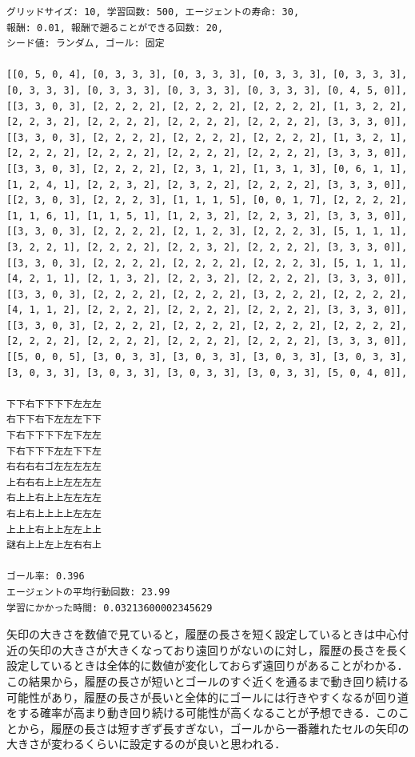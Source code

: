 \documentclass[a4j,11pt]{jarticle}
\begin{document}
\begin{verbatim}
グリッドサイズ: 10, 学習回数: 500, エージェントの寿命: 30,
報酬: 0.01, 報酬で遡ることができる回数: 20,
シード値: ランダム, ゴール: 固定

[[0, 5, 0, 4], [0, 3, 3, 3], [0, 3, 3, 3], [0, 3, 3, 3], [0, 3, 3, 3], [0, 3, 3, 3], [0, 3, 3, 3], [0, 3, 3, 3], [0, 3, 3, 3], [0, 4, 5, 0]],
[[3, 3, 0, 3], [2, 2, 2, 2], [2, 2, 2, 2], [2, 2, 2, 2], [1, 3, 2, 2], [2, 2, 3, 2], [2, 2, 2, 2], [2, 2, 2, 2], [2, 2, 2, 2], [3, 3, 3, 0]],
[[3, 3, 0, 3], [2, 2, 2, 2], [2, 2, 2, 2], [2, 2, 2, 2], [1, 3, 2, 1], [2, 2, 2, 2], [2, 2, 2, 2], [2, 2, 2, 2], [2, 2, 2, 2], [3, 3, 3, 0]],
[[3, 3, 0, 3], [2, 2, 2, 2], [2, 3, 1, 2], [1, 3, 1, 3], [0, 6, 1, 1], [1, 2, 4, 1], [2, 2, 3, 2], [2, 3, 2, 2], [2, 2, 2, 2], [3, 3, 3, 0]],
[[2, 3, 0, 3], [2, 2, 2, 3], [1, 1, 1, 5], [0, 0, 1, 7], [2, 2, 2, 2], [1, 1, 6, 1], [1, 1, 5, 1], [1, 2, 3, 2], [2, 2, 3, 2], [3, 3, 3, 0]],
[[3, 3, 0, 3], [2, 2, 2, 2], [2, 1, 2, 3], [2, 2, 2, 3], [5, 1, 1, 1], [3, 2, 2, 1], [2, 2, 2, 2], [2, 2, 3, 2], [2, 2, 2, 2], [3, 3, 3, 0]],
[[3, 3, 0, 3], [2, 2, 2, 2], [2, 2, 2, 2], [2, 2, 2, 3], [5, 1, 1, 1], [4, 2, 1, 1], [2, 1, 3, 2], [2, 2, 3, 2], [2, 2, 2, 2], [3, 3, 3, 0]],
[[3, 3, 0, 3], [2, 2, 2, 2], [2, 2, 2, 2], [3, 2, 2, 2], [2, 2, 2, 2], [4, 1, 1, 2], [2, 2, 2, 2], [2, 2, 2, 2], [2, 2, 2, 2], [3, 3, 3, 0]],
[[3, 3, 0, 3], [2, 2, 2, 2], [2, 2, 2, 2], [2, 2, 2, 2], [2, 2, 2, 2], [2, 2, 2, 2], [2, 2, 2, 2], [2, 2, 2, 2], [2, 2, 2, 2], [3, 3, 3, 0]],
[[5, 0, 0, 5], [3, 0, 3, 3], [3, 0, 3, 3], [3, 0, 3, 3], [3, 0, 3, 3], [3, 0, 3, 3], [3, 0, 3, 3], [3, 0, 3, 3], [3, 0, 3, 3], [5, 0, 4, 0]],

下下右下下下下左左左
右下下右下左左左下下
下右下下下下左下左左
下右下下下左左下下左
右右右右ゴ左左左左左
上右右右上上左左左左
右上上右上上左左左左
右上右上上上上左左左
上上上右上上左左上上
謎右上上左上左右右上

ゴール率: 0.396
エージェントの平均行動回数: 23.99
学習にかかった時間: 0.03213600002345629
\end{verbatim}

\newpage

矢印の大きさを数値で見ていると，履歴の長さを短く設定しているときは中心付近の矢印の大きさが大きくなっており遠回りがないのに対し，履歴の長さを長く設定しているときは全体的に数値が変化しておらず遠回りがあることがわかる．この結果から，履歴の長さが短いとゴールのすぐ近くを通るまで動き回り続ける可能性があり，履歴の長さが長いと全体的にゴールには行きやすくなるが回り道をする確率が高まり動き回り続ける可能性が高くなることが予想できる．このことから，履歴の長さは短すぎず長すぎない，ゴールから一番離れたセルの矢印の大きさが変わるくらいに設定するのが良いと思われる．
\end{document}
